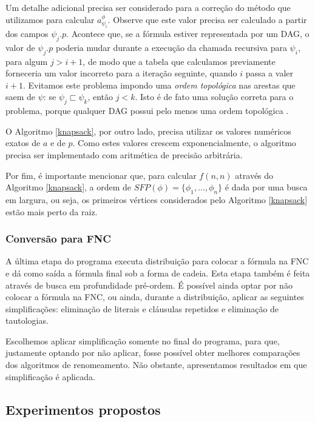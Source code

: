 Um detalhe adicional precisa ser considerado para a correção do método que utilizamos para calcular $a_{\psi_i}^\phi$. Observe que este valor precisa ser calculado a partir dos campos $\psi_j.p$. Acontece que, se a fórmula estiver representada por um DAG, o valor de $\psi_j.p$ poderia mudar durante a execução da chamada recursiva para $\psi_i$, para algum $j > i+1$, de modo que a tabela que calculamos previamente forneceria um valor incorreto para a iteração seguinte, quando $i$ passa a valer $i+1$. Evitamos este problema impondo uma \emph{ordem topológica} nas arestas que saem de $\psi$: se $\psi_j \sqsubset \psi_k$, então $j < k$. Isto é de fato uma solução correta para o problema, porque qualquer DAG possui pelo menos uma ordem topológica \cite{CLRS09}.

O Algoritmo \ref{knapsack}, por outro lado, precisa utilizar os valores numéricos exatos de $a$ e de $p$. Como estes valores crescem exponencialmente, o algoritmo precisa ser implementado com aritmética de precisão arbitrária.

Por fim, é importante mencionar que, para calcular $f(n,n)$ através do Algoritmo \ref{knapsack}, a ordem de $SFP(\phi) = \{\phi_1,...,\phi_n \}$ é dada por uma busca em largura, ou seja, os primeiros vértices considerados pelo Algoritmo \ref{knapsack} estão mais perto da raiz.

\subsubsection{Conversão para FNC}

\indent

A última etapa do programa executa distribuição para colocar a fórmula na FNC e dá como saída a fórmula final sob a forma de cadeia. Esta etapa também é feita através de busca em profundidade pré-ordem. É possível ainda optar por não colocar a fórmula na FNC, ou ainda, durante a distribuição, aplicar as seguintes simplificações: eliminação de literais e cláusulas repetidos e eliminação de tautologias.

Escolhemos aplicar simplificação somente no final do programa, para que, justamente optando por não aplicar, fosse possível obter melhores comparações dos algoritmos de renomeamento. Não obstante, apresentamos resultados em que simplificação é aplicada.

\subsection{Experimentos propostos}


